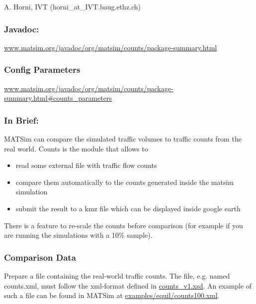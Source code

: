 A. Horni, IVT (horni\_at\_IVT.baug.ethz.ch)

\subsubsection{\textbf{\textbf{Javadoc:
\\}}}

\href{http://www.matsim.org/javadoc/org/matsim/counts/package-summary.html}{www.matsim.org/javadoc/org/matsim/counts/package-summary.html}


\subsubsection{\textbf{\textbf{Config Parameters{}}}}

\href{http://www.matsim.org/javadoc/org/matsim/counts/package-summary.html#counts_parameters}{www.matsim.org/javadoc/org/matsim/counts/package-summary.html\#counts\_parameters}

\subsubsection{\textbf{In Brief:}}

MATSim can compare the simulated traffic volumes to traffic counts from the real world. Counts is the module that allows to
\begin{itemize}
	\item read some external file with traffic flow counts
	\item compare them automatically to the counts generated inside the matsim simulation
	\item submit the result to a kmz file which can be displayed inside google earth
\end{itemize}

There is a feature to re-scale the counts before comparison (for example if you are running the simulations with a 10\% sample).

\subsubsection{Comparison Data}

Prepare a file containing the real-world traffic counts. The file, e.g. named counts.xml, must follow the xml-format defined in \href{http://matsim.org/files/dtd/counts_v1.xsd}{counts\_v1.xsd}. An example of such a file can be found in MATSim at \href{http://matsim.svn.sourceforge.net/viewvc/matsim/matsim/trunk/examples/equil/counts100.xml?content-type=text%2Fplain}{examples/equil/counts100.xml}.

